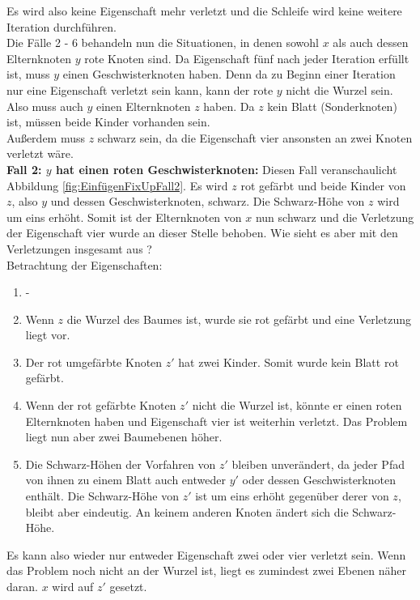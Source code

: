 \documentclass[a4paper,12pt]{article}
\begin{document}
\noindent Es wird also keine Eigenschaft mehr verletzt und die Schleife wird keine weitere Iteration durchführen.\\
Die Fälle 2 - 6 behandeln nun die Situationen, in denen sowohl $x$ als auch dessen Elternknoten $y$ rote Knoten sind. Da Eigenschaft fünf nach jeder Iteration erfüllt ist, muss $y$ einen Geschwisterknoten haben. Denn da zu Beginn einer Iteration nur eine Eigenschaft verletzt sein kann, kann der rote $y$ nicht die Wurzel sein. Also muss auch $y$ einen Elternknoten $z$ haben. Da $z$ kein Blatt (Sonderknoten) ist, müssen beide Kinder vorhanden sein.\\
Außerdem muss $z$ schwarz sein, da die Eigenschaft vier ansonsten an zwei Knoten verletzt wäre.\\

\noindent\textbf{Fall 2: $y$ hat einen roten Geschwisterknoten: } \label{if2}
\noindent Diesen Fall veranschaulicht Abbildung \ref{fig:EinfügenFixUpFall2}. Es wird $z$ rot gefärbt und beide Kinder von $z$, also $y$ und dessen Geschwisterknoten, schwarz. Die Schwarz-Höhe von $z$ wird um eins erhöht. Somit ist der Elternknoten von $x$ nun schwarz und die Verletzung der Eigenschaft vier wurde an dieser Stelle behoben. Wie sieht es aber mit den Verletzungen insgesamt aus ? \\

Betrachtung der Eigenschaften:

\begin{enumerate}
	\item -
	\item Wenn $z$ die Wurzel des Baumes ist, wurde sie rot gefärbt und eine Verletzung liegt vor.
	\item Der rot umgefärbte Knoten $z'$ hat zwei Kinder. Somit wurde kein Blatt rot gefärbt.
	\item  Wenn der rot gefärbte Knoten $z'$ nicht die Wurzel ist, könnte er einen roten Elternknoten haben und Eigenschaft vier ist weiterhin verletzt. Das Problem liegt nun aber zwei Baumebenen höher.
	\item  Die Schwarz-Höhen der Vorfahren von $z'$ bleiben unverändert, da jeder Pfad von ihnen zu einem Blatt auch entweder $y'$ oder dessen Geschwisterknoten enthält. Die Schwarz-Höhe von $z'$ ist um eins erhöht gegenüber derer von $z$, bleibt aber eindeutig. An keinem anderen Knoten ändert sich die Schwarz-Höhe. 
	
\end{enumerate} 
Es kann also wieder nur entweder Eigenschaft zwei oder vier verletzt sein. Wenn das Problem noch nicht an der Wurzel ist, liegt es zumindest zwei Ebenen näher daran. $x$ wird auf $z'$ gesetzt. 
\end{document}
